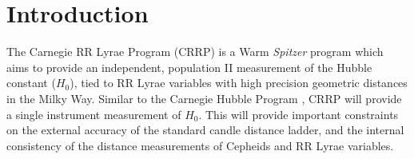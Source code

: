 \documentclass[a4paper,fleqn,usenatbib]{mnras}
\begin{document}


\section{Introduction}
\label{sec:intro}

%
%

The Carnegie RR Lyrae Program (CRRP) is a Warm {\it Spitzer} program \citep[][PID 90002]{2012sptz.prop90002F} which aims to provide an independent, population II measurement of the Hubble constant ($H_{0}$), tied to RR Lyrae variables with high precision geometric distances in the Milky Way. Similar to the Carnegie Hubble Program \citep[CHP][]{2011AJ....142..192F}, CRRP will provide a single instrument measurement of $H_{0}$. This will provide important constraints on the external accuracy of the standard candle distance ladder, and the internal consistency of the distance measurements of Cepheids and RR Lyrae variables.
\end{document}
